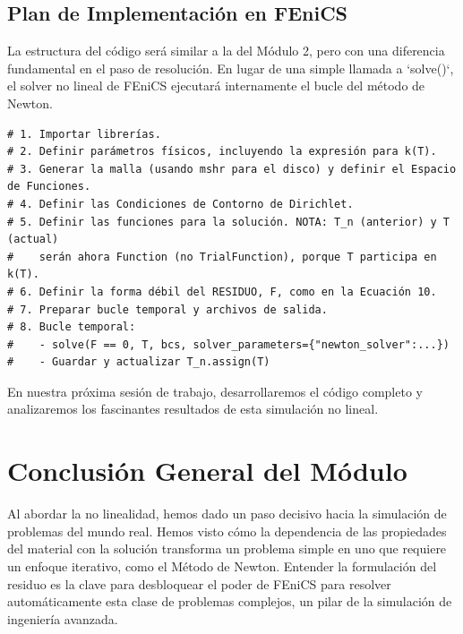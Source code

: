 \subsection{Plan de Implementación en FEniCS}
La estructura del código será similar a la del Módulo 2, pero con una diferencia fundamental en el paso de resolución. En lugar de una simple llamada a `solve()`, el solver no lineal de FEniCS ejecutará internamente el bucle del método de Newton.

\begin{tcolorbox}[colback=CodeBackground, title=Estructura del Script de Simulación No Lineal]
\begin{lstlisting}[style=pythonstyle]
# 1. Importar librerías.
# 2. Definir parámetros físicos, incluyendo la expresión para k(T).
# 3. Generar la malla (usando mshr para el disco) y definir el Espacio de Funciones.
# 4. Definir las Condiciones de Contorno de Dirichlet.
# 5. Definir las funciones para la solución. NOTA: T_n (anterior) y T (actual)
#    serán ahora Function (no TrialFunction), porque T participa en k(T).
# 6. Definir la forma débil del RESIDUO, F, como en la Ecuación 10.
# 7. Preparar bucle temporal y archivos de salida.
# 8. Bucle temporal:
#    - solve(F == 0, T, bcs, solver_parameters={"newton_solver":...})
#    - Guardar y actualizar T_n.assign(T)
\end{lstlisting}
\end{tcolorbox}
En nuestra próxima sesión de trabajo, desarrollaremos el código completo y analizaremos los fascinantes resultados de esta simulación no lineal.

\section{Conclusión General del Módulo}
Al abordar la no linealidad, hemos dado un paso decisivo hacia la simulación de problemas del mundo real. Hemos visto cómo la dependencia de las propiedades del material con la solución transforma un problema simple en uno que requiere un enfoque iterativo, como el Método de Newton. Entender la formulación del residuo es la clave para desbloquear el poder de FEniCS para resolver automáticamente esta clase de problemas complejos, un pilar de la simulación de ingeniería avanzada.
